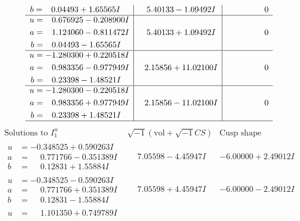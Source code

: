 \documentclass[1p]{elsarticle_modified}
\theoremstyle{definition}
\newcommand{\I}{\sqrt{-1}}
\begin{document}
$$\begin{array}{c|c|c}
\begin{aligned}
b &= \phantom{-}0.04493 + 1.65565 I\end{aligned}
 & \phantom{-}5.40133 - 1.09492 I & \phantom{-0.000000 } 0 \\ \hline\begin{aligned}
u &= \phantom{-}0.676925 - 0.208900 I \\
a &= \phantom{-}1.124060 - 0.811472 I \\
b &= \phantom{-}0.04493 - 1.65565 I\end{aligned}
 & \phantom{-}5.40133 + 1.09492 I & \phantom{-0.000000 } 0 \\ \hline\begin{aligned}
u &= -1.280300 + 0.220518 I \\
a &= \phantom{-}0.983356 - 0.977949 I \\
b &= \phantom{-}0.23398 - 1.48521 I\end{aligned}
 & \phantom{-}2.15856 + 11.02100 I & \phantom{-0.000000 } 0 \\ \hline\begin{aligned}
u &= -1.280300 - 0.220518 I \\
a &= \phantom{-}0.983356 + 0.977949 I \\
b &= \phantom{-}0.23398 + 1.48521 I\end{aligned}
 & \phantom{-}2.15856 - 11.02100 I & \phantom{-0.000000 } 0\\
 \hline 
 \end{array}$$\newpage$$\begin{array}{c|c|c}  
\text{Solutions to }I^u_{1}& \I (\text{vol} + \sqrt{-1}CS) & \text{Cusp shape}\\
 \hline 
\begin{aligned}
u &= -0.348525 + 0.590263 I \\
a &= \phantom{-}0.771766 - 0.351389 I \\
b &= \phantom{-}0.12831 + 1.55884 I\end{aligned}
 & \phantom{-}7.05598 - 4.45947 I & -6.00000 + 2.49012 I \\ \hline\begin{aligned}
u &= -0.348525 - 0.590263 I \\
a &= \phantom{-}0.771766 + 0.351389 I \\
b &= \phantom{-}0.12831 - 1.55884 I\end{aligned}
 & \phantom{-}7.05598 + 4.45947 I & -6.00000 - 2.49012 I \\ \hline\begin{aligned}
u &= \phantom{-}1.101350 + 0.749789 I \\

\end{aligned}
\end{array}$$
\end{document}
